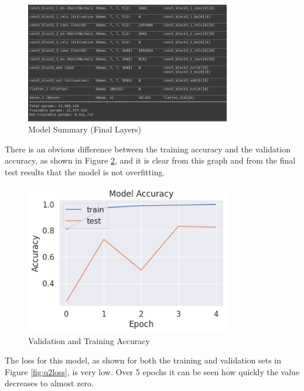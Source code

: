 \begin{figure}[H]
	\centering
	\includegraphics[width=0.8\textwidth]{images/q2/model}
	\caption{Model Summary (Final Layers)}
	\label{fig:q2model}
\end{figure}

There is an obvious difference between the training accuracy and the validation
accuracy, as shown in Figure \ref{fig:q2acc}, and it is clear from this graph
and from the final test results that the model is not overfitting.

\begin{figure}[H]
	\centering
	\includegraphics[width=0.8\textwidth]{images/q2/accuracy}
	\caption{Validation and Training Accuracy}
	\label{fig:q2acc}
\end{figure}

The loss for this model, as shown for both the training and validation sets in
Figure \ref{fig:q2loss}, is very low.
Over 5 epochs it can be seen how quickly the value decreases to almost zero.

